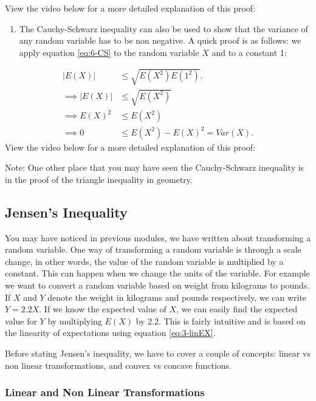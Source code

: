 \documentclass[
]{book}
\providecommand{\tightlist}{%
  \setlength{\itemsep}{0pt}\setlength{\parskip}{0pt}}
\begin{document}
View the video below for a more detailed explanation of this proof:

\begin{enumerate}
\def\labelenumi{\arabic{enumi}.}
\setcounter{enumi}{1}
\tightlist
\item
  The Cauchy-Schwarz inequality can also be used to show that the variance of any random variable has to be non negative. A quick proof is as follows: we apply equation \eqref{eq:6-CS} to the random variable \(X\) and to a constant 1:
\end{enumerate}

\[
\begin{split}
|E(X)| & \leq \sqrt{E(X^2)E(1^2)}. \\
\implies |E(X)| & \leq \sqrt{E(X^2)} \\
\implies E(X)^2 & \leq E(X^2) \\
\implies 0 & \leq E(X^2) - E(X)^2 = Var(X).
\end{split}
\]
View the video below for a more detailed explanation of this proof:

Note: One other place that you may have seen the Cauchy-Schwarz inequality is in the proof of the triangle inequality in geometry.

\hypertarget{jensens-inequality}{%
\subsection{Jensen's Inequality}\label{jensens-inequality}}

You may have noticed in previous modules, we have written about transforming a random variable. One way of transforming a random variable is through a scale change, in other words, the value of the random variable is multiplied by a constant. This can happen when we change the units of the variable. For example we want to convert a random variable based on weight from kilograms to pounds. If \(X\) and \(Y\) denote the weight in kilograms and pounds respectively, we can write \(Y = 2.2X\). If we know the expected value of \(X\), we can easily find the expected value for \(Y\) by multiplying \(E(X)\) by 2.2. This is fairly intuitive and is based on the linearity of expectations using equation \eqref{eq:3-linEX}.

Before stating Jensen's inequality, we have to cover a couple of concepts: linear vs non linear transformations, and convex vs concave functions.

\hypertarget{linnonlin}{%
\subsubsection{Linear and Non Linear Transformations}\label{linnonlin}}
\end{document}
